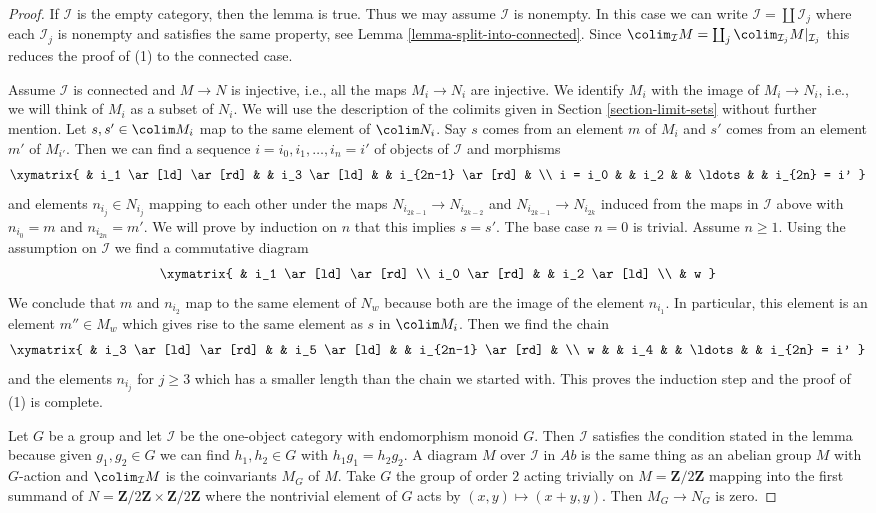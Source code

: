 \begin{proof}
If $\mathcal{I}$ is the empty category, then the lemma is true.
Thus we may assume $\mathcal{I}$ is nonempty. In this case
we can write $\mathcal{I} = \coprod \mathcal{I}_j$ where each
$\mathcal{I}_j$ is nonempty and satisfies the same property, see
Lemma \ref{lemma-split-into-connected}. Since
$\colim_\mathcal{I} M = \coprod_j \colim_{\mathcal{I}_j} M|_{\mathcal{I}_j}$
this reduces the proof of (1) to the connected case.

\medskip\noindent
Assume $\mathcal{I}$ is connected and $M \to N$ is injective, i.e.,
all the maps $M_i \to N_i$ are injective.
We identify $M_i$ with the image of $M_i \to N_i$, i.e.,
we will think of $M_i$ as a subset of $N_i$.
We will use the description of the colimits given in
Section \ref{section-limit-sets} without further mention.
Let $s, s' \in \colim M_i$ map to the same element of $\colim N_i$.
Say $s$ comes from an element $m$ of $M_i$ and $s'$ comes from an
element $m'$ of $M_{i'}$. Then we can find a sequence
$i = i_0, i_1, \ldots, i_n = i'$ of objects of $\mathcal{I}$
and morphisms
$$
\xymatrix{
&
i_1 \ar[ld] \ar[rd] & &
i_3 \ar[ld] & &
i_{2n-1} \ar[rd] & \\
i = i_0 & &
i_2 & &
\ldots & &
i_{2n} = i'
}
$$
and elements $n_{i_j} \in N_{i_j}$ mapping to each other under
the maps $N_{i_{2k-1}} \to N_{i_{2k-2}}$ and $N_{i_{2k-1}}
\to N_{i_{2k}}$ induced from the maps in $\mathcal{I}$ above
with $n_{i_0} = m$ and $n_{i_{2n}} = m'$. We will prove by induction
on $n$ that this implies $s = s'$. The base case $n = 0$ is trivial.
Assume $n \geq 1$. Using the assumption on $\mathcal{I}$
we find a commutative diagram
$$
\xymatrix{
& i_1 \ar[ld] \ar[rd] \\
i_0 \ar[rd] & & i_2 \ar[ld] \\
& w
}
$$
We conclude that $m$ and $n_{i_2}$ map to the same element of $N_w$
because both are the image of the element $n_{i_1}$.
In particular, this element is an element $m'' \in M_w$ which
gives rise to the same element as $s$ in $\colim M_i$.
Then we find the chain
$$
\xymatrix{
&
i_3 \ar[ld] \ar[rd] & &
i_5 \ar[ld] & &
i_{2n-1} \ar[rd] & \\
w & &
i_4 & &
\ldots & &
i_{2n} = i'
}
$$
and the elements $n_{i_j}$ for $j \geq 3$ which has a smaller length
than the chain we started with. This proves the induction step and the
proof of (1) is complete.

\medskip\noindent
Let $G$ be a group and let $\mathcal{I}$ be the one-object category with
endomorphism monoid $G$. Then $\mathcal{I}$ satisfies the condition stated
in the lemma because given $g_1, g_2 \in G$ we can find $h_1, h_2 \in G$
with $h_1 g_1 = h_2 g_2$. A diagram $M$ over $\mathcal{I}$ in
$\textit{Ab}$ is the same thing as an abelian group $M$ with $G$-action
and $\colim_\mathcal{I} M$ is the coinvariants $M_G$ of $M$.
Take $G$ the group of order $2$ acting trivially on $M = \mathbf{Z}/2\mathbf{Z}$
mapping into the first summand of
$N = \mathbf{Z}/2\mathbf{Z} \times \mathbf{Z}/2\mathbf{Z}$
where the nontrivial element of $G$ acts by
$(x, y) \mapsto (x + y, y)$. Then $M_G \to N_G$ is zero.
\end{proof}

